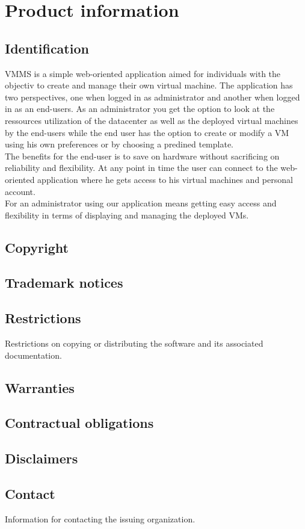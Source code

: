 \chapter{Product information}
\vspace{-6em}


\section{Identification}
VMMS is a simple web-oriented application aimed for individuals with the
objectiv to create and manage their own virtual machine. The application    
has two perspectives, one when logged in as administrator and another when
logged in as an end-users. As an administrator you get the option to look at
the ressources utilization of the datacenter as well as the deployed virtual
machines by the end-users while the end user has the option to create or modify 
a VM using his own preferences or by choosing a predined template.\\The benefits
for the end-user is to save on hardware without sacrificing on reliability and 
flexibility. At any point in time the user can connect to the web-oriented
application where he gets access to his virtual machines and personal
account.\\For an administrator using our application means getting easy access 
and flexibility in terms of displaying and managing the deployed VMs.

\section{Copyright}

\section{Trademark notices}

\section{Restrictions}
Restrictions on copying or distributing the software and its associated
documentation.

\section{Warranties}

\section{Contractual obligations}

\section{Disclaimers}

\section{Contact}
Information for contacting the issuing organization.